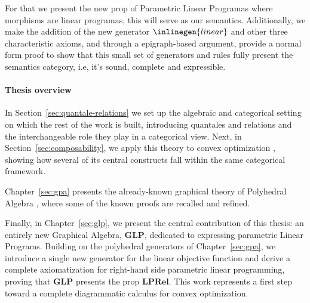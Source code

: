 For that we present the new prop of Parametric Linear Programas where morphisms
are linear programas, this will serve as our semantics.
Additionally, we make the addition of the new generator
$\inlinegen{linear}$ and other three characteristic axioms,
and through a epigraph-based argument,
provide a normal form proof to show that this small set of generators and rules fully
present the semantics category, i.e, it's sound, complete and expressible.

\paragraph{Thesis overview}
In Section~\ref{sec:quantale-relations} we set up the algebraic and categorical
setting on which the rest of the work is built, introducing quantales and
relations and the interchangeable role they play in a categorical view. Next, in
Section~\ref{sec:composability}, we apply this theory to convex optimization
\cite{stein2024compositional, Khadh2026bridging}, showing how several of its
central constructs fall within the same categorical framework.

Chapter~\ref{sec:gpa} presents the already-known graphical theory of Polyhedral Algebra
\cite{bonchi2021polyhedral}, where some of the known proofs are recalled and refined.

Finally, in Chapter~\ref{sec:glp}, we present the central contribution of this thesis:
an entirely new Graphical Algebra, \textbf{GLP}, dedicated to expressing parametric Linear Programs.
Building on the polyhedral generators of Chapter~\ref{sec:gpa}, we introduce a single new generator
for the linear objective function and derive a complete axiomatization for right-hand side parametric
linear programming, proving that \textbf{GLP} presents the prop $\mathbf{LPRel}$.
This work represents a first step toward a complete diagrammatic calculus for convex optimization.

